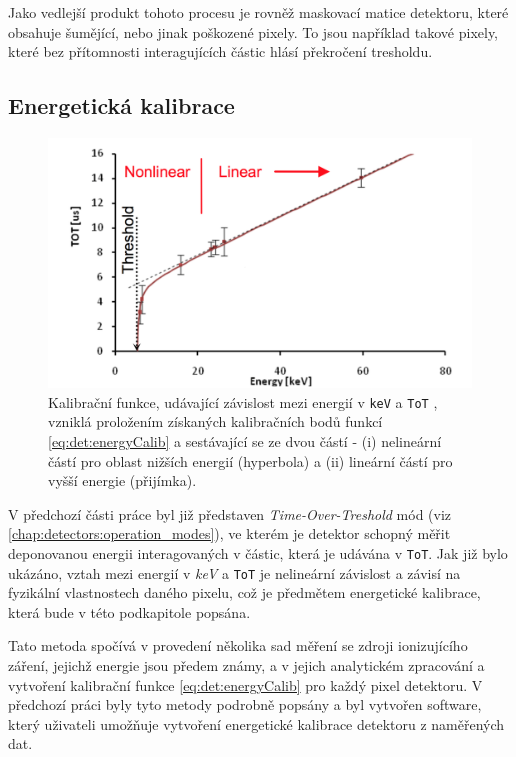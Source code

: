 Jako vedlejší produkt tohoto procesu je rovněž maskovací matice detektoru, které obsahuje šumějící, nebo jinak poškozené pixely. To jsou například takové pixely, které bez přítomnosti interagujících částic hlásí překročení tresholdu.

\subsection{Energetická kalibrace}\label{chap:detectors:calibration:energy}
\begin{figure}[th]
	\begin{center}
		\includegraphics[width=13cm]{figures/calib_function.png}
		\caption{Kalibrační funkce, udávající závislost mezi energií v \texttt{keV} a \texttt{ToT} \cite{Jakubek2011S262}, vzniklá proložením získaných kalibračních bodů funkcí \ref{eq:det:energyCalib} a sestávající se ze dvou částí - (i) nelineární částí pro oblast nižších energií (hyperbola) a (ii) lineární částí pro vyšší energie (přijímka).}
		\label{fig:det:calib:calib_function}
	\end{center}
\end{figure}

V předchozí části práce byl již představen \textit{Time-Over-Treshold} mód (viz \ref{chap:detectors:operation_modes}), ve kterém je detektor schopný měřit deponovanou energii interagovaných v částic, která je udávána v \texttt{ToT}. Jak již bylo ukázáno, vztah mezi energií v \textit{keV} a \texttt{ToT} je nelineární závislost a závisí na fyzikální vlastnostech daného pixelu, což je předmětem energetické kalibrace, která bude v této podkapitole popsána.

Tato metoda \cite{Jakubek2011S262} spočívá v provedení několika sad měření se zdroji ionizujícího záření, jejichž energie jsou předem známy, a v jejich analytickém zpracování a vytvoření kalibrační funkce \ref{eq:det:energyCalib} pro každý pixel detektoru. V předchozí práci \cite{BegeraBcThesis2016} byly tyto metody podrobně popsány a byl vytvořen software, který uživateli umožňuje vytvoření energetické kalibrace detektoru z naměřených dat.

